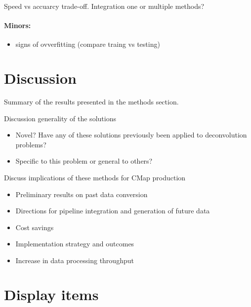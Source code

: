 \documentclass[]{article}
\providecommand{\tightlist}{%
  \setlength{\itemsep}{0pt}\setlength{\parskip}{0pt}}
\let\oldparagraph\paragraph
\renewcommand{\paragraph}[1]{\oldparagraph{#1}\mbox{}}
\begin{document}
Speed vs accuarcy trade-off. Integration one or multiple methods?

\hypertarget{minors}{%
\paragraph{Minors:}\label{minors}}

\begin{itemize}
\tightlist
\item
  signs of ovverfitting (compare traing vs testing)
\end{itemize}

\hypertarget{discussion}{%
\section{Discussion}\label{discussion}}

Summary of the results presented in the methods section.

Discussion generality of the solutions

\begin{itemize}
\tightlist
\item
  Novel? Have any of these solutions previously been applied to
  deconvolution problems?
\item
  Specific to this problem or general to others?
\end{itemize}

Discuss implications of these methods for CMap production

\begin{itemize}
\tightlist
\item
  Preliminary results on past data conversion
\item
  Directions for pipeline integration and generation of future data
\item
  Cost savings
\item
  Implementation strategy and outcomes
\item
  Increase in data processing throughput
\end{itemize}

\hypertarget{display-items}{%
\section{Display items}\label{display-items}}
\end{document}
